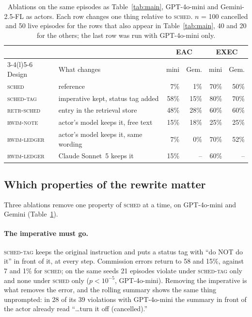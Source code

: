 \begin{table}[t]
\caption{Ablations on the same episodes as Table~\ref{tab:main}, GPT-4o-mini
and Gemini-2.5-FL as actors. Each row changes one thing relative to
\textsc{sched}. $n$ = 100 cancelled and 50 live episodes for the rows that
also appear in Table~\ref{tab:main}, 40 and 20 for the others; the last row
was run with GPT-4o-mini only.}
\label{tab:abl}
\footnotesize
\setlength{\tabcolsep}{3.2pt}
\renewcommand{\arraystretch}{0.95}
\begin{tabular}{@{}llrrrr@{}}
\toprule
 & & \multicolumn{2}{c}{EAC} & \multicolumn{2}{c}{EXEC} \\
\cmidrule(lr){3-4}\cmidrule(l){5-6}
Design & What changes & mini & Gem. & mini & Gem. \\
\midrule
\textsc{sched}      & reference                          & 7\%  & 1\%  & 70\% & 50\% \\
\textsc{sched-tag}  & imperative kept, status tag added  & 58\% & 15\% & 80\% & 70\% \\
\textsc{retr-sched} & entry in the retrieval store       & 48\% & 28\% & 60\% & 60\% \\
\textsc{rwim-note}  & actor's model keeps it, free text  & 15\% & 18\% & 25\% & 25\% \\
\textsc{rwim-ledger}& actor's model keeps it, same wording & 7\% & 0\%  & 70\% & 52\% \\
\textsc{rwim-ledger}& Claude Sonnet~5 keeps it           & 15\% & --   & 60\% & -- \\
\bottomrule
\end{tabular}
\end{table}

\subsection{Which properties of the rewrite matter}
\label{sec:ablations}

Three ablations remove one property of \textsc{sched} at a time, on
GPT-4o-mini and Gemini (Table~\ref{tab:abl}).

\paragraph{The imperative must go.} \textsc{sched-tag} keeps the original
instruction and puts a status tag with ``do NOT do it'' in front of it, at
every step. Commission errors return to 58 and 15\%, against 7 and 1\% for
\textsc{sched}; on the same seeds 21 episodes violate under
\textsc{sched-tag} only and none under \textsc{sched} only ($p<10^{-5}$,
GPT-4o-mini). Removing the imperative is what removes the error, and the
rolling summary shows the same thing unprompted: in 28 of its 39
violations with GPT-4o-mini the summary in front of the actor already read
``\ldots turn it off (cancelled).''

